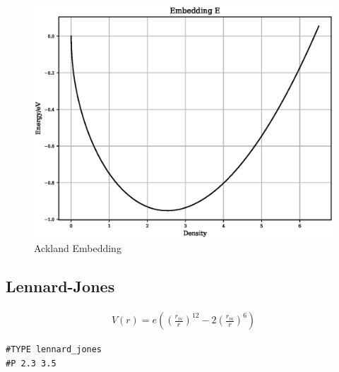 \documentclass[12pt,twoside]{manual}
\begin{document}
\begin{appendices}
\FloatBarrier
\begin{figure}[h]
  \begin{center}
    \includegraphics[scale=0.5]{img/plots/embedding_e.eps}
    \caption{Ackland Embedding}
    \label{graph:graph1}
  \end{center}
\end{figure}
\FloatBarrier









\subsection{Lennard-Jones}

\begin{equation}
\begin{split}
V(r) = e \left(\left(\frac{r_m}{r}\right)^12 - 2 \left(\frac{r_m}{r}\right)^6\right)
\end{split}
\label{eq:eqLennardJones}
\end{equation}

\begin{lstlisting}[style=pseudocode,caption={Lennard-Jones}]
#TYPE lennard_jones
#P 2.3 3.5
\end{lstlisting}


\end{appendices}
\end{document}
